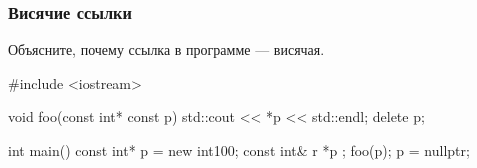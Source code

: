 \documentclass[compress, 8pt]{beamer}
\begin{document}
\begin{frame}[fragile]

    \frametitle{Висячие ссылки}

    \begin{task}
        Объясните, почему ссылка в программе --- висячая.
    \end{task}

    \begin{myinplacelisting}[minted language=cpp]
#include <iostream>

void foo(const int* const p) {
    std::cout << *p << std::endl;
    delete p;
}

int main() {
    const int* p = new int{100};
    const int& r { *p };
    foo(p);
    p = nullptr;
}
    \end{myinplacelisting}

\end{frame}
\end{document}
